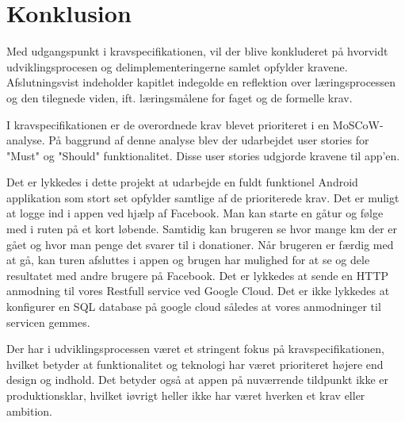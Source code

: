 \thispagestyle{fancy}
\chapter{Konklusion}
\label{chp:Konklusion}
Med udgangspunkt i kravspecifikationen, vil der blive konkluderet på hvorvidt udviklingsprocesen og delimplementeringerne samlet opfylder kravene. Afslutningsvist indeholder kapitlet indegolde en reflektion over læringsprocessen og den tilegnede viden, ift. læringsmålene for faget og de formelle krav.

I kravspecifikationen er de overordnede krav blevet prioriteret i en MoSCoW-analyse. På baggrund af denne analyse blev der udarbejdet user stories for "Must" og "Should" funktionalitet. Disse user stories udgjorde kravene til app'en. 

Det er lykkedes i dette projekt at udarbejde en fuldt funktionel Android applikation som stort set opfylder samtlige af de prioriterede krav. Det er muligt at logge ind i appen ved hjælp af Facebook. Man kan starte en gåtur og følge med i ruten på et kort løbende. Samtidig kan brugeren se hvor mange km der er gået og hvor man penge det svarer til i donationer. Når brugeren er færdig med at gå, kan turen afsluttes i appen og brugen har mulighed for at se og dele resultatet med andre brugere på Facebook. Det er lykkedes at sende en HTTP anmodning til vores Restfull service ved Google Cloud. Det er ikke lykkedes at konfigurer en SQL database på google cloud således at vores anmodninger til servicen gemmes.

Der har i udviklingsprocessen været et stringent fokus på kravspecifikationen, hvilket betyder at funktionalitet og teknologi har været prioriteret højere end design og indhold. Det betyder også at appen på nuværrende tildpunkt ikke er produktionsklar, hvilket iøvrigt heller ikke har været hverken et krav eller ambition.




